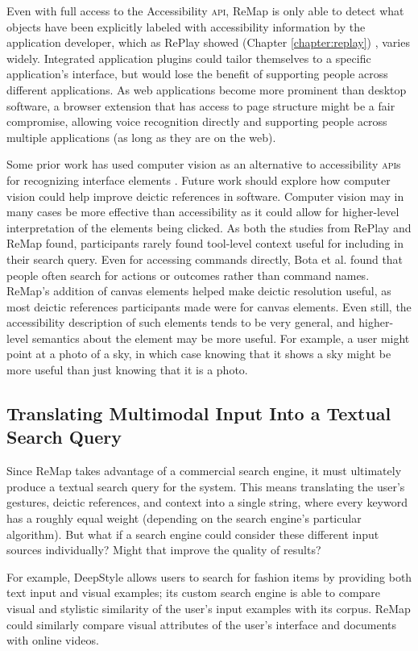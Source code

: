 Even with full access to the Accessibility \textsc{api}, ReMap is only able to detect what objects have been explicitly labeled with accessibility information by the application developer, which as RePlay showed (Chapter \ref{chapter:replay}) , varies widely. Integrated application plugins could tailor themselves to a specific application's interface, but would lose the benefit of supporting people across different applications. As web applications become more prominent than desktop software, a browser extension that has access to page structure might be a fair compromise, allowing voice recognition directly and supporting people across multiple applications (as long as they are on the web). 

Some prior work has used computer vision as an alternative to accessibility \textsc{api}s for recognizing interface elements \cite{Chang2011, Hurst2010, Dixon2010}. Future work should explore how computer vision could help improve deictic references in software. Computer vision may in many cases be more effective than accessibility as it could allow for higher-level interpretation of the elements being clicked. As both the studies from RePlay and ReMap found, participants rarely found tool-level context useful for including in their search query. Even for accessing commands directly, Bota et al. \cite{Bota2018} found that people often search for actions or outcomes rather than command names. ReMap's addition of canvas elements helped make deictic resolution useful, as most deictic references participants made were for canvas elements. Even still, the accessibility description of such elements tends to be very general, and higher-level semantics about the element may be more useful. For example, a user might point at a photo of a sky, in which case knowing that it shows a sky might be more useful than just knowing that it is a photo. 

\subsection{Translating Multimodal Input Into a Textual Search Query}
Since ReMap takes advantage of a commercial search engine, it must ultimately produce a textual search query for the system. This means translating the user's gestures, deictic references, and context into a single string, where every keyword has a roughly equal weight (depending on the search engine's particular algorithm). But what if a search engine could consider these different input sources individually? Might that improve the quality of results? 

For example, DeepStyle \cite{Tautkute2019} allows users to search for fashion items by providing both text input and visual examples; its custom search engine is able to compare visual and stylistic similarity of the user's input examples with its corpus. ReMap could similarly compare visual attributes of the user's interface and documents with online videos.